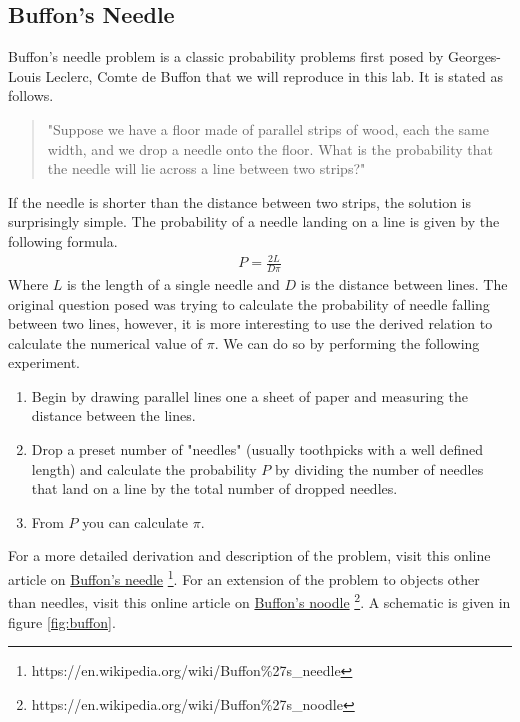 \subsection{Buffon's Needle}
Buffon's needle problem is a classic probability problems first posed by Georges-Louis Leclerc, Comte de Buffon that we will reproduce in this lab. It is stated as follows.
\begin{quotation}
"Suppose we have a floor made of parallel strips of wood, each the same width, and we drop a needle onto the floor. What is the probability that the needle will lie across a line between two strips?"
\end{quotation}
If the needle is shorter than the distance between two strips, the solution is surprisingly simple. The probability of a needle landing on a line is given by the following formula.
\begin{gather}
P = \frac{2 L}{D \pi}
\label{equ:buffon}
\end{gather}
Where $L$ is the length of a single needle and $D$ is the distance between lines. The original question posed was trying to calculate the probability of needle falling between two lines, however, it is more interesting to use the derived relation to calculate the numerical value of $\pi$. We can do so by performing the following experiment.
\begin{enumerate}
\item Begin by drawing parallel lines one a sheet of paper and measuring the distance between the lines.
\item Drop a preset number of "needles" (usually toothpicks with a well defined length) and calculate the probability $P$ by dividing the number of needles that land on a line by the total number of dropped needles.
\item From $P$ you can calculate $\pi$.
\end{enumerate}
For a more detailed derivation and description of the problem, visit this online article on \href{https://en.wikipedia.org/wiki/Buffon\%27s_needle}{Buffon's needle} \footnote{https://en.wikipedia.org/wiki/Buffon\%27s\_needle}. For an extension of the problem to objects other than needles, visit this online article on \href{https://en.wikipedia.org/wiki/Buffon\%27s_noodle}{Buffon's noodle} \footnote{https://en.wikipedia.org/wiki/Buffon\%27s\_noodle}. A schematic is given in figure \ref{fig:buffon}.

